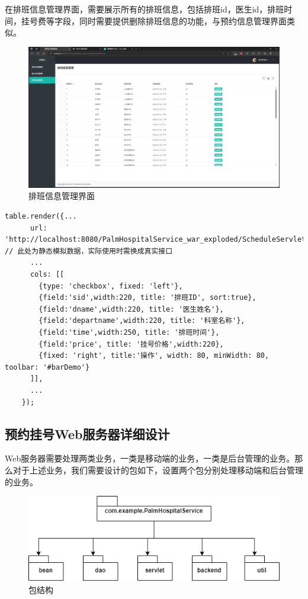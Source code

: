 \documentclass[UTF8,12pt]{article}
\begin{document}
在排班信息管理界面，需要展示所有的排班信息，包括排班id，医生id，排班时间，挂号费等字段，同时需要提供删除排班信息的功能，与预约信息管理界面类似。

\begin{figure}[htbp]
    \centering
    \includegraphics[width=1.0\textwidth]{imgs/20.png}
    \caption{排班信息管理界面}
\end{figure}

\begin{lstlisting}[frame=shadowbox]
    table.render({...
      url: 'http://localhost:8080/PalmHospitalService_war_exploded/ScheduleServlet', // 此处为静态模拟数据，实际使用时需换成真实接口
      ...
      cols: [[
        {type: 'checkbox', fixed: 'left'},
        {field:'sid',width:220, title: '排班ID', sort:true},
        {field:'dname',width:220, title: '医生姓名'},
        {field:'departname',width:220, title: '科室名称'},
        {field:'time',width:250, title: '排班时间'},
        {field:'price', title: '挂号价格',width:220},
        {fixed: 'right', title:'操作', width: 80, minWidth: 80, toolbar: '#barDemo'}
      ]],
      ...
    });
\end{lstlisting}

\newpage

\subsection{预约挂号Web服务器详细设计}
Web服务器需要处理两类业务，一类是移动端的业务，一类是后台管理的业务。那么对于上述业务，我们需要设计的包如下，设置两个包分别处理移动端和后台管理的业务。

\begin{figure}[htbp]
    \centering
    \includegraphics[width=1.0\textwidth]{imgs/16.png}
    \caption{包结构}
\end{figure}
\end{document}
